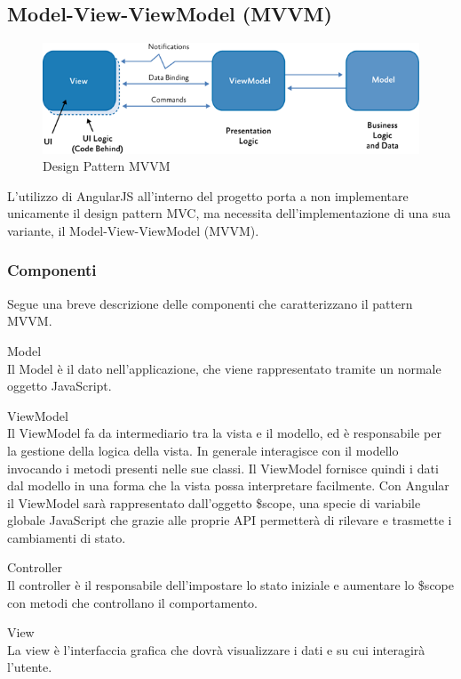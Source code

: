 \documentclass[a4paper, titlepage]{article}
\begin{document}
\subsection{Model-View-ViewModel (MVVM)}
\begin{figure}[htp]
\centering
\includegraphics[scale=0.50]{Img/MVVM.png}
\caption{Design Pattern MVVM}
\label{} 
\end{figure}
L'utilizzo di AngularJS all'interno del progetto porta a non implementare unicamente il design pattern MVC, ma 
necessita dell'implementazione di una sua variante, il Model-View-ViewModel (MVVM).

\subsubsection{Componenti}
Segue una breve descrizione delle componenti che caratterizzano il pattern MVVM.

\begin{description}
\item{Model} 
\\ Il Model è il dato nell’applicazione, che viene rappresentato tramite un normale oggetto JavaScript.
\item{ViewModel}
\\ Il ViewModel fa da intermediario tra la vista e il modello, ed è responsabile per la gestione della logica della vista. In generale interagisce con il modello invocando i metodi presenti nelle sue classi.
Il ViewModel fornisce quindi i dati dal modello in una forma che la vista possa interpretare facilmente.
\newline Con Angular il ViewModel sarà rappresentato dall’oggetto \$scope, una specie di variabile globale JavaScript che grazie alle proprie API permetterà di rilevare e trasmette i cambiamenti di stato.
\item{Controller}
\\ Il controller è il responsabile dell’impostare lo stato iniziale e aumentare lo \$scope con metodi che controllano il comportamento.
\item{View}
\\ La view è l’interfaccia grafica che dovrà visualizzare i dati e su cui interagirà l'utente.
\end{description}
\end{document}
